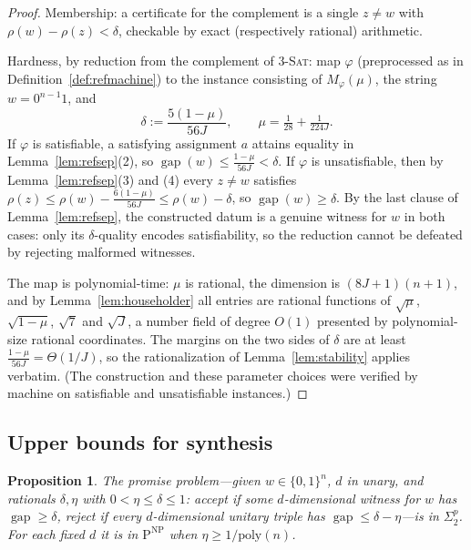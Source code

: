 \documentclass[11pt]{amsart}
\newtheorem{proposition}[theorem]{Proposition}
\theoremstyle{definition}
\theoremstyle{remark}
\newcommand{\gapp}{\operatorname{gap}}
\begin{document}
\begin{proof}
Membership: a certificate for the complement is a single $z\ne w$
with $\rho(w)-\rho(z)<\delta$, checkable by exact (respectively
rational) arithmetic.

Hardness, by reduction from the complement of
\textup{\textsc{3-Sat}}: map $\varphi$ (preprocessed as in
Definition~\ref{def:refmachine}) to the instance consisting of
$M_\varphi(\mu)$, the string $w=0^{n-1}1$, and
\[
  \delta:=\frac{5(1-\mu)}{56J},
  \qquad \mu=\tfrac1{28}+\tfrac1{224J} .
\]
If $\varphi$ is satisfiable, a satisfying assignment $a$ attains
equality in Lemma~\ref{lem:refsep}(2), so
$\gapp(w)\le\frac{1-\mu}{56J}<\delta$. If $\varphi$ is
unsatisfiable, then by Lemma~\ref{lem:refsep}(3) and (4) every
$z\ne w$ satisfies
$\rho(z)\le\rho(w)-\frac{6(1-\mu)}{56J}\le\rho(w)-\delta$, so
$\gapp(w)\ge\delta$. By the last clause of
Lemma~\ref{lem:refsep}, the constructed datum is a genuine witness
for $w$ in both cases: only its $\delta$-quality encodes
satisfiability, so the reduction cannot be defeated by rejecting
malformed witnesses.

The map is polynomial-time: $\mu$ is rational, the dimension is
$(8J+1)(n+1)$, and by Lemma~\ref{lem:householder} all entries are
rational functions of $\sqrt\mu$, $\sqrt{1-\mu}$, $\sqrt7$ and
$\sqrt J$, a number field of degree $O(1)$ presented by
polynomial-size rational coordinates. The margins on the two sides
of $\delta$ are at least $\frac{1-\mu}{56J}=\Theta(1/J)$, so the
rationalization of Lemma~\ref{lem:stability} applies verbatim. (The
construction and these parameter choices were verified by machine
on satisfiable and unsatisfiable instances.)
\end{proof}

\subsection*{Upper bounds for synthesis}

\begin{proposition}\label{prop:sigma2}
The promise problem---given $w\in\{0,1\}^n$, $d$ in unary, and
rationals $\delta,\eta$ with $0<\eta\le\delta\le1$: accept if some
$d$-dimensional witness for $w$ has $\gapp\ge\delta$, reject if every
$d$-dimensional unitary triple has $\gapp\le\delta-\eta$---is in
$\Sigma_2^p$. For each fixed $d$ it is in
$\mathrm{P}^{\mathrm{NP}}$ when $\eta\ge1/\mathrm{poly}(n)$.
\end{proposition}
\end{document}
